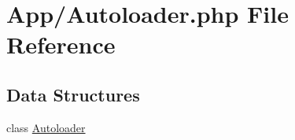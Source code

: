 \hypertarget{_autoloader_8php}{}\section{App/\+Autoloader.php File Reference}
\label{_autoloader_8php}
\subsection*{Data Structures}
\begin{DoxyCompactItemize}
\item 
class \hyperlink{class_autoloader}{Autoloader}
\end{DoxyCompactItemize}
